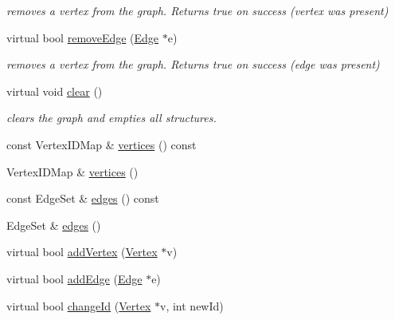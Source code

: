 \begin{DoxyCompactItemize}
\begin{DoxyCompactList}\small\item\em removes a vertex from the graph. Returns true on success (vertex was present) \end{DoxyCompactList}\item 
\hypertarget{classg2o_1_1HyperGraph_a33e5a60705ce673d647aa1613da9d99b}{virtual bool \hyperlink{classg2o_1_1HyperGraph_a33e5a60705ce673d647aa1613da9d99b}{remove\-Edge} (\hyperlink{classg2o_1_1HyperGraph_1_1Edge}{Edge} $\ast$e)}\label{classg2o_1_1HyperGraph_a33e5a60705ce673d647aa1613da9d99b}

\begin{DoxyCompactList}\small\item\em removes a vertex from the graph. Returns true on success (edge was present) \end{DoxyCompactList}\item 
\hypertarget{classg2o_1_1HyperGraph_a6b629dff2928dbd704ca81f24858e72f}{virtual void \hyperlink{classg2o_1_1HyperGraph_a6b629dff2928dbd704ca81f24858e72f}{clear} ()}\label{classg2o_1_1HyperGraph_a6b629dff2928dbd704ca81f24858e72f}

\begin{DoxyCompactList}\small\item\em clears the graph and empties all structures. \end{DoxyCompactList}\item 
const Vertex\-I\-D\-Map \& \hyperlink{classg2o_1_1HyperGraph_a3e713e7ee84eecad3876651737af6cfc}{vertices} () const 
\item 
Vertex\-I\-D\-Map \& \hyperlink{classg2o_1_1HyperGraph_a650107c875ef6f43d438d7d3e2ddf797}{vertices} ()
\item 
const Edge\-Set \& \hyperlink{classg2o_1_1HyperGraph_acb3391945ed7c3f09243101d9ef0aaf0}{edges} () const 
\item 
Edge\-Set \& \hyperlink{classg2o_1_1HyperGraph_a2f9f023fe2fb491ef9af873b9e683006}{edges} ()
\item 
virtual bool \hyperlink{classg2o_1_1HyperGraph_a7ef87ba3479827b24c6fc29c5fc3aa21}{add\-Vertex} (\hyperlink{classg2o_1_1HyperGraph_1_1Vertex}{Vertex} $\ast$v)
\item 
virtual bool \hyperlink{classg2o_1_1HyperGraph_a0f1d35009a2879b238c8148c33485c89}{add\-Edge} (\hyperlink{classg2o_1_1HyperGraph_1_1Edge}{Edge} $\ast$e)
\item 
virtual bool \hyperlink{classg2o_1_1HyperGraph_a74f0d7392e67762a85799db72a58a94c}{change\-Id} (\hyperlink{classg2o_1_1HyperGraph_1_1Vertex}{Vertex} $\ast$v, int new\-Id)
\end{DoxyCompactItemize}
